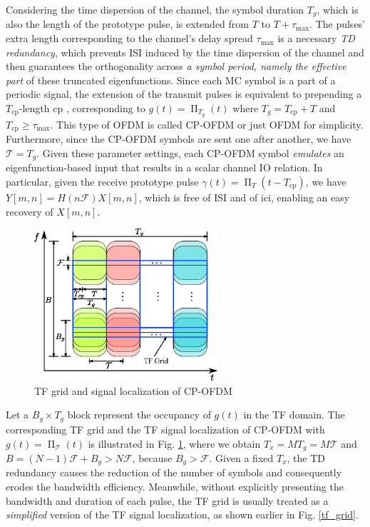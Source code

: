 \documentclass[journal]{IEEEtran}
\DeclareMathOperator{\rect}{\Pi}
\begin{document}
Considering the time dispersion of the channel, the symbol duration $T_g$, which is also the length of the prototype pulse, is extended from $T$ to $T+\tau_{\textrm{max}}$.
The pulses' extra length corresponding to the channel's  delay spread $\tau_{\textrm{max}}$ is a necessary \emph{TD redundancy}, which prevents ISI induced by the time dispersion of the channel and then guarantees the orthogonality across \emph{a symbol period, namely the effective part} of these truncated eigenfunctions.
Since each MC symbol is a part of a periodic signal, the extension of the transmit pulses is equivalent to prepending a $T_{\textrm{cp}}$-length \ac{cp} \cite{cp}, corresponding to $g(t)=\rect_{T_g}(t)$ where $ T_g=T_{\textrm{cp}}+T$ and $T_{\textrm{cp}}\ge \tau_{\textrm{max}}$. This type of OFDM is called CP-OFDM or just OFDM for simplicity. Furthermore, since the CP-OFDM symbols are sent one after another, we have $\mathcal T=T_g$.
Given these parameter settings, each CP-OFDM symbol  \emph{emulates} an eigenfunction-based input that results in a scalar channel IO relation.
In particular, given the receive prototype pulse $\gamma(t)=\rect_T(t-T_{\textrm{cp}})$, we have $Y[m,n]=H(n\mathcal F)X[m,n]$, which is free of ISI and of \ac{ici}, enabling an easy recovery of $X[m,n]$.


\begin{figure}
  \centering
  \includegraphics[width=6.8cm]{tf_grid}
  \caption{TF grid and signal localization of CP-OFDM}
  \label{tf_lattice}
  \vspace*{-7mm}
\end{figure}

Let a $B_g\times T_g$ block represent the occupancy of $g(t)$ in the TF domain. The corresponding TF grid and the TF signal localization of CP-OFDM with $g(t)=\rect_{\mathcal T}(t)$ is illustrated in Fig. \ref{tf_lattice}, where we obtain $T_x =MT_g= M\mathcal T$ and $B=(N-1)\mathcal F+B_g > N\mathcal F$, because $B_g>\mathcal F$. Given a fixed $T_x$, {the TD redundancy causes the reduction of the number of symbols} and consequently erodes the bandwidth efficiency. Meanwhile, without explicitly presenting the bandwidth and duration of each pulse, the TF grid is usually treated as a \emph{simplified} version of the TF signal localization\cite{tff}, as shown earlier in Fig. \ref{tf_grid}.
\end{document}
